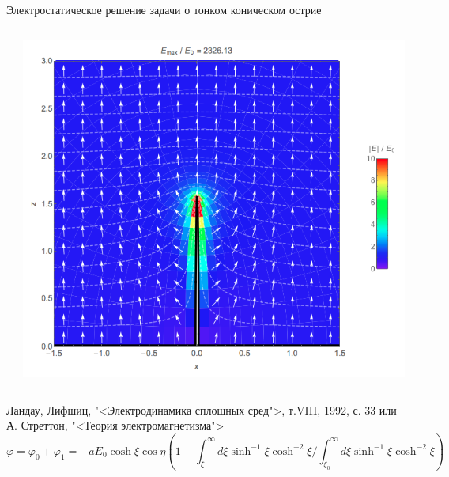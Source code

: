 \documentclass[9pt, compress, xcolor=table]{beamer}
\begin{document}
\begin{frame}{Электростатическое решение задачи о тонком коническом острие}
\begin{columns}[c]
\begin{center}
 \end{center}
 \column{4cm}
\begin{center}
\includegraphics[width=\textwidth]{stat2}
\end{center}
\end{columns}
\scriptsize{Ландау, Лифшиц, "<Электродинамика сплошных сред">, т.VIII, 1992, с. 33 или А. Стреттон, "<Теория электромагнетизма">}
\begin{equation*}
\varphi = \varphi_0 + \varphi_1 = -a E_0 \cosh\xi\cos\eta\left(1-{\int_\xi^\infty d\xi \sinh^{-1}\xi\cosh^{-2}\xi}/{\int_{\xi_0}^\infty d\xi \sinh^{-1}\xi\cosh^{-2}\xi}\right)
\end{equation*}

\end{frame}
\end{document}
